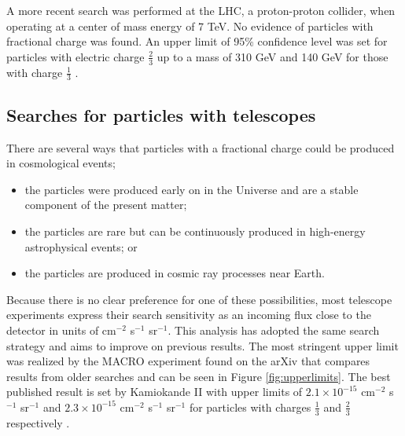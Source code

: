 A more recent search was performed at the LHC, a proton-proton collider, when operating at a center of mass energy of 7 TeV. No evidence of particles with fractional charge was found. An upper limit of 95\% confidence level was set for particles with electric charge $\frac{2}{3}$ up to a mass of 310 GeV and 140 GeV for those with charge $\frac{1}{3}$ \cite{CMS:2012xi}.

\subsection{Searches for particles with telescopes}
There are several ways that particles with a fractional charge could be produced in cosmological events;

\begin{itemize}
\item the particles were produced early on in the Universe and are a stable component of the present matter;
\item the particles are rare but can be continuously produced in high-energy astrophysical events; or
\item the particles are produced in cosmic ray processes near Earth.
\end{itemize}
Because there is no clear preference for one of these possibilities, most telescope experiments express their search sensitivity as an incoming flux close to the detector in units of cm$^{-2}$ s$^{-1}$ sr$^{-1}$. This analysis has adopted the same search strategy and aims to improve on previous results. The most stringent upper limit was realized by the MACRO experiment found on the arXiv that compares results from older searches and can be seen in Figure \ref{fig:upperlimits}. The best published result is set by Kamiokande II with upper limits of $2.1 \times 10^{-15}$ cm$^{-2}$ s$^{-1}$ sr$^{-1}$ and $2.3 \times 10^{-15}$ cm$^{-2}$ s$^{-1}$ sr$^{-1}$ for particles with charges $\frac{1}{3}$ and $\frac{2}{3}$ respectively \cite{Mori:1990kw}.

